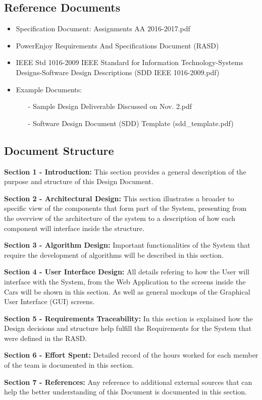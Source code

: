 \documentclass[a4paper]{article}
\begin{document}
\subsection{Reference Documents}
\begin{itemize}
\item Specification Document: Assignments AA 2016-2017.pdf
\item PowerEnjoy Requirements And Specifications Document (RASD)
\item IEEE Std 1016-2009 IEEE Standard for Information Technology-Systems Designs-Software Design Descriptions (SDD IEEE 1016-2009.pdf)
\item Example Documents:
\begin{itemize}
\item[-] Sample Design Deliverable Discussed on Nov. 2.pdf
\item[-] Software Design Document (SDD) Template (sdd\_template.pdf)
\end{itemize}
\end{itemize}

\newpage
\subsection{Document Structure}
\begin{description}
\item \textbf{Section 1 - Introduction:} This section provides a general description of the purpose and structure of this Design Document.
\item \textbf{Section 2 - Architectural Design:} This section illustrates a broader to specific view of the components that form part of the System, presenting from the overview of the architecture of the system to a description of how each component will interface inside the structure.
\item \textbf{Section 3 - Algorithm Design:} Important functionalities of the System that require the development of algorithms will be described in this section.  
\item \textbf{Section 4 - User Interface Design:} All details refering to how the User will interface with the System, from the Web Application to the screens inside the Cars will be shown in this section. As well as general mockups of the Graphical User Interface (GUI) screens.
\item \textbf{Section 5 - Requirements Traceability:} In this section is explained how the Design decisions and structure help fulfill the Requirements for the System that were defined in the RASD. 
\item \textbf{Section 6 - Effort Spent:} Detailed record of the hours worked for each member of the team is documented in this section.
\item \textbf{Section 7 - References:} Any reference to additional external sources that can help the better understanding of this Document is documented in this section.
\end{description}
\end{document}
